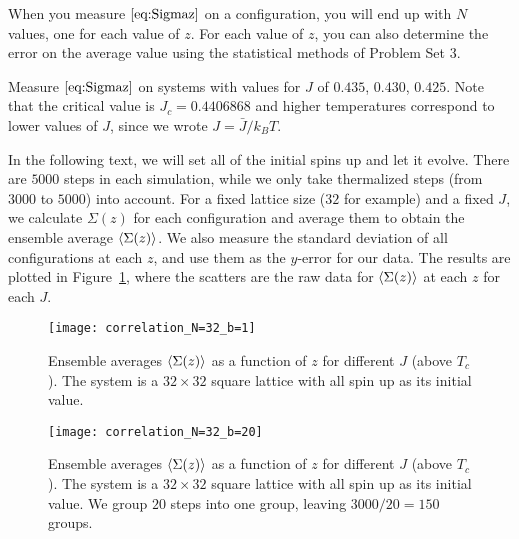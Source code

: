 When you measure \(\eqref{eq:Sigmaz}\) on a configuration, you will end up with \(N\)
values, one for each value of \(z\). For each value of \(z\), you can also determine the
error on the average value using the statistical methods of Problem Set 3.

\Question{} Measure \(\eqref{eq:Sigmaz}\) on systems with values for \(J\) of \(0.435\),
\(0.430\), \(0.425\). Note that the critical value is \(J_c = 0.4406868\) and higher
temperatures correspond to lower values of \(J\), since we wrote \(J = \bar{J} / k_B T\).

\Answer{}
In the following text, we will set all of the initial spins up and let it evolve.
There are \(5000\) steps in each simulation, while we only take thermalized steps
(from \(3000\) to \(5000\)) into account.
For a fixed lattice size (\(32\) for example) and a fixed \(J\),
we calculate \(\Sigma(z)\) for each configuration and average them to obtain the
ensemble average \(\expval{\Sigma(z)}\).
We also measure the standard deviation of all configurations at each \(z\),
and use them as the \(y\)-error for our data.
The results are plotted in Figure~\ref{fig:cor_N=32_bin=1},
where the scatters are the raw data for \(\expval{\Sigma(z)}\) at each \(z\)
for each \(J\).

\begin{figure}
    \centering
    \texttt{[image: correlation\_N=32\_b=1]}
    \caption{Ensemble averages \(\expval{\Sigma(z)}\) as a function of \(z\) for different
        \(J\) (above \(T_c\)). The system is a \(32 \times 32\) square lattice
        with all spin up as its initial value.}
    \label{fig:cor_N=32_bin=1}
\end{figure}

\begin{figure}[H]
    \centering
    \texttt{[image: correlation\_N=32\_b=20]}
    \caption{Ensemble averages \(\expval{\Sigma(z)}\) as a function of \(z\) for different
        \(J\) (above \(T_c\)). The system is a \(32 \times 32\) square lattice
        with all spin up as its initial value.
        We group \(20\) steps into one group, leaving \(3000 / 20 = 150\) groups.}
    \label{fig:cor_N=32_bin=20}
\end{figure}

